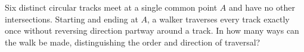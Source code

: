 Six distinct circular tracks meet at a single common point $A$ and have no other intersections. Starting and ending at $A$, a walker traverses every track exactly once without reversing direction partway around a track. In how many ways can the walk be made, distinguishing the order and direction of traversal?
